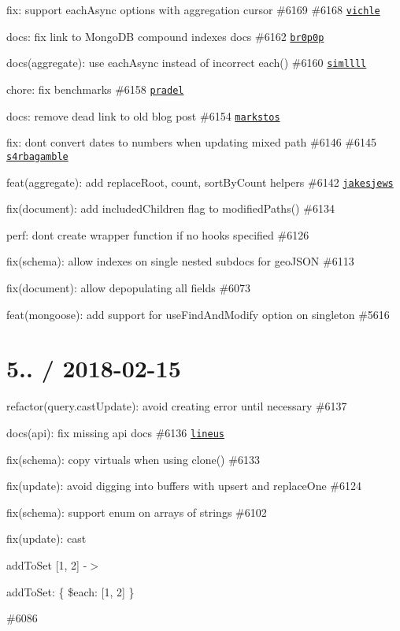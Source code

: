 \begin{DoxyItemize}
\item fix\+: support each\+Async options with aggregation cursor \#6169 \#6168 \href{https://github.com/vichle}{\tt vichle}
\item docs\+: fix link to Mongo\+DB compound indexes docs \#6162 \href{https://github.com/br0p0p}{\tt br0p0p}
\item docs(aggregate)\+: use each\+Async instead of incorrect {\ttfamily each()} \#6160 \href{https://github.com/simllll}{\tt simllll}
\item chore\+: fix benchmarks \#6158 \href{https://github.com/pradel}{\tt pradel}
\item docs\+: remove dead link to old blog post \#6154 \href{https://github.com/markstos}{\tt markstos}
\item fix\+: don\textquotesingle{}t convert dates to numbers when updating mixed path \#6146 \#6145 \href{https://github.com/s4rbagamble}{\tt s4rbagamble}
\item feat(aggregate)\+: add replace\+Root, count, sort\+By\+Count helpers \#6142 \href{https://github.com/jakesjews}{\tt jakesjews}
\item fix(document)\+: add included\+Children flag to modified\+Paths() \#6134
\item perf\+: don\textquotesingle{}t create wrapper function if no hooks specified \#6126
\item fix(schema)\+: allow indexes on single nested subdocs for geo\+J\+S\+ON \#6113
\item fix(document)\+: allow depopulating all fields \#6073
\item feat(mongoose)\+: add support for {\ttfamily use\+Find\+And\+Modify} option on singleton \#5616
\end{DoxyItemize}

\section*{5.. / 2018-\/02-\/15 }


\begin{DoxyItemize}
\item refactor(query.\+cast\+Update)\+: avoid creating error until necessary \#6137
\item docs(api)\+: fix missing api docs \#6136 \href{https://github.com/lineus}{\tt lineus}
\item fix(schema)\+: copy virtuals when using {\ttfamily clone()} \#6133
\item fix(update)\+: avoid digging into buffers with upsert and replace\+One \#6124
\item fix(schema)\+: support {\ttfamily enum} on arrays of strings \#6102
\item fix(update)\+: cast {\ttfamily \begin{DoxyParagraph}{add\+To\+Set}
\mbox{[}1, 2\mbox{]} -\/$>$ {\ttfamily }
\end{DoxyParagraph}
add\+To\+Set\+: \{ \$each\+: \mbox{[}1, 2\mbox{]} \}} \#6086
\end{DoxyItemize}


